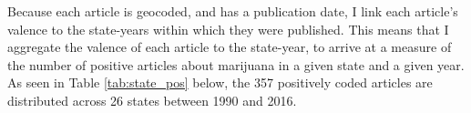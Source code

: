   


Because each article is geocoded, and has a publication date, I link each article's valence to the state-years within which they were published. This means that I aggregate the valence of each article to the state-year, to arrive at a measure of the number of positive articles about marijuana in a given state and a given year. As seen in Table   \ref{tab:state_pos} below, the 357 positively coded articles are distributed across 26 states between 1990 and 2016.  








